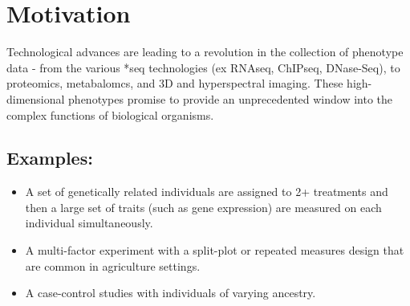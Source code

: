 \documentclass[11pt]{amsart}
\begin{document}
%
%	
%	
%	
\section{Motivation}
	Technological advances are leading to a revolution in the collection of phenotype data - from the various *seq technologies (ex RNAseq, ChIPseq, DNase-Seq), to proteomics, metabalomcs, and 3D and hyperspectral imaging. These high-dimensional phenotypes promise to provide an unprecedented window into the complex functions of biological organisms. 
\subsection{Examples:}
\begin{itemize}
\item A set of genetically related individuals are assigned to 2+ treatments and then a large set of traits (such as gene expression) are measured on each individual simultaneously. 
\item A multi-factor experiment with a split-plot or repeated measures design that are common in agriculture settings.
\item A case-control studies with individuals of varying ancestry. 
\end{itemize}
	
\end{document}
